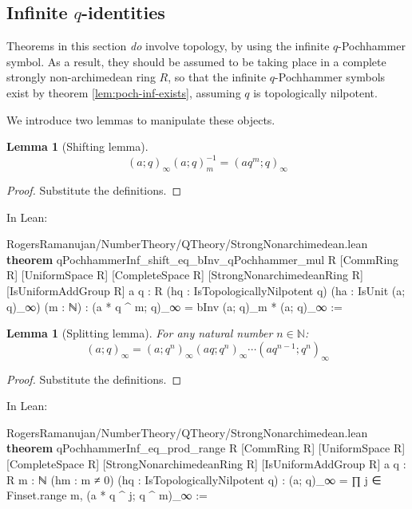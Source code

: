 \documentclass[12pt]{amsart}
\newtheorem{lemma}[theorem]{Lemma}
\theoremstyle{definition}
\theoremstyle{remark}
\numberwithin{equation}{subsection}
\newcommand{\N}{\mathbb N}
\newcommand{\kw}[1]{\textcolor{keywordcolor}{\textbf{#1}}}
\newcommand{\var}[1]{\textcolor{tacticcolor}{#1}}
\newcommand{\num}[1]{\textcolor{numcolor}{#1}}
\newcommand{\imp}[1]{\textcolor{commentcolor}{\textbraceleft#1\textbraceright}}
\begin{document}
\subsection{Infinite $q$-identities}

Theorems in this section \textit{do} involve topology, by using the infinite $q$-Pochhammer symbol. As a result, they should be assumed to be taking place in a complete strongly non-archimedean ring $R$, so that the infinite $q$-Pochhammer symbols exist by theorem \ref{lem:poch-inf-exists}, assuming $q$ is topologically nilpotent.

We introduce two lemmas to manipulate these objects.

\begin{lemma}[Shifting lemma]
\label{lem:shift}
\begin{equation}
(a; q)_\infty (a; q)_m^{-1} = (aq^m; q)_\infty
\end{equation}
\end{lemma}
\begin{proof}
Substitute the definitions.
\end{proof}

In Lean:

\begin{code}{RogersRamanujan/NumberTheory/QTheory/StrongNonarchimedean.lean}
\kw{theorem} qPochhammerInf_shift_eq_bInv_qPochhammer_mul \imp{R} [CommRing \var{R}] [UniformSpace \var{R}]
  [CompleteSpace \var{R}] [StrongNonarchimedeanRing \var{R}] [IsUniformAddGroup \var{R}]
  \imp{a q : R} (\var{hq} : IsTopologicallyNilpotent \var{q}) (\var{ha} : IsUnit (\var{a}; \var{q})_∞) (\var{m} : ℕ) :
  (\var{a} * \var{q} ^ \var{m}; \var{q})_∞ = bInv (\var{a}; \var{q})_\var{m} * (\var{a}; \var{q})_∞ :=
\end{code}
\begin{lemma}[Splitting lemma]
\label{lem:split}
For any natural number $n \in \N$:
\begin{equation}(a; q)_\infty = (a; q^n)_\infty (aq; q^n)_\infty \cdots (aq^{n-1}; q^n)_\infty\end{equation}
\end{lemma}
\begin{proof}
Substitute the definitions.
\end{proof}

In Lean:

\begin{code}{RogersRamanujan/NumberTheory/QTheory/StrongNonarchimedean.lean}
\kw{theorem} qPochhammerInf_eq_prod_range \imp{R} [CommRing \var{R}] [UniformSpace \var{R}]
  [CompleteSpace \var{R}] [StrongNonarchimedeanRing \var{R}] [IsUniformAddGroup \var{R}]
  \imp{a q : R} \imp{m : ℕ} (\var{hm} : \var{m} ≠ \num{0}) (\var{hq} : IsTopologicallyNilpotent \var{q}) :
  (\var{a}; \var{q})_∞ = ∏ \var{j} ∈ Finset.range \var{m}, (\var{a} * \var{q} ^ \var{j}; \var{q} ^ \var{m})_∞ :=
\end{code}
\end{document}
